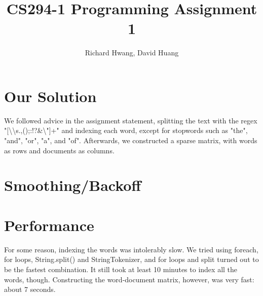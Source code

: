 \documentclass[11pt]{article}
\title{CS294-1 Programming Assignment 1}
\author{Richard Hwang, David Huang}
\begin{document}
\maketitle

\section{Our Solution}
We followed advice in the assignment statement, splitting the text with the regex "[\textbackslash \textbackslash s.,();:!?\&\textbackslash"]+" and indexing each word, except for stopwords such as "the", "and", "or", "a", and "of".  Afterwards, we constructed a sparse matrix, with words as rows and documents as columns.
\section{Smoothing/Backoff}

\section{Performance}
For some reason, indexing the words was intolerably slow.  We tried using foreach, for loops, String.split() and StringTokenizer, and for loops and split turned out to be the fastest combination.  It still took at least 10 minutes to index all the words, though.  Constructing the word-document matrix, however, was very fast: about 7 seconds.
\end{document}
